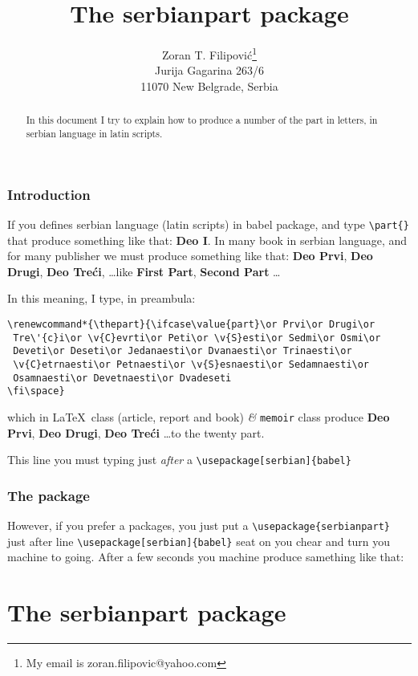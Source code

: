 \documentclass[a4paper,12pt]{article}
\title{The \textsf{serbianpart} package}
\author{Zoran T. Filipovi\'{c}\protect\footnote{My email is zoran.filipovic@yahoo.com} \\ 
        Jurija Gagarina 263/6 \\ 
        11070 New Belgrade, Serbia \\}
\begin{document}
\frenchspacing
\maketitle

\begin{abstract}
In this document I try to explain how to produce a number of the part in letters,
in serbian language in latin scripts.
\end{abstract}

\section{Introduction}

If you defines serbian language (latin scripts) in babel package, and type 
\verb|\part{}| that produce something like that: \textbf{Deo I}. In many book 
in serbian language, and for many publisher we must produce something like that: 
\textbf{Deo Prvi}, \textbf{Deo Drugi}, \textbf{Deo Tre\'{c}i}, \ldots like 
\textbf{First Part}, \textbf{Second Part} \ldots 

In this meaning, I type, in preambula: 

\begin{verbatim}
\renewcommand*{\thepart}{\ifcase\value{part}\or Prvi\or Drugi\or 
 Tre\'{c}i\or \v{C}evrti\or Peti\or \v{S}esti\or Sedmi\or Osmi\or
 Deveti\or Deseti\or Jedanaesti\or Dvanaesti\or Trinaesti\or
 \v{C}etrnaesti\or Petnaesti\or \v{S}esnaesti\or Sedamnaesti\or
 Osamnaesti\or Devetnaesti\or Dvadeseti
\fi\space}
\end{verbatim}

which in \LaTeX\ class (article, report and book) \textit{\&} \verb|memoir| class 
produce \textbf{Deo Prvi}, \textbf{Deo Drugi}, \textbf{Deo Tre\'{c}i} \ldots to the 
twenty part. 

This line you must typing just \textit{after} a \verb|\usepackage[serbian]{babel}|

\section{The package}

However, if you prefer a packages, you just put a \verb|\usepackage{serbianpart}| just 
after line \verb|\usepackage[serbian]{babel}| seat on you chear and turn you machine 
to going. After a few seconds you machine produce samething like that:

\part{The serbianpart package}
\end{document}
